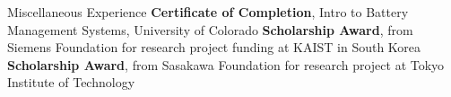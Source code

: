 \begin{rubric}{\faAward Miscellaneous Experience}
\entry*[2024] \textbf{Certificate of Completion}, Intro to Battery Management Systems, University of Colorado
%
\entry*[2023] \textbf{Scholarship Award}, from Siemens Foundation for research project funding at KAIST in South Korea
%
\entry*[2020] \textbf{Scholarship Award}, from Sasakawa Foundation for research project at Tokyo Institute of Technology
%
%
\end{rubric}